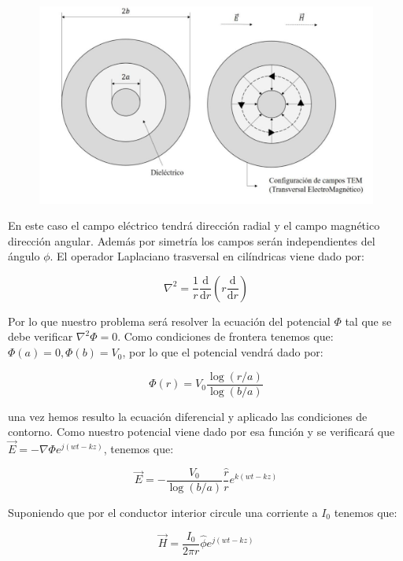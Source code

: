 \documentclass[12pt]{article}
\newcommand{\parentesis}[1]{\left( #1  \right)}
\newcommand{\D}{\mathrm{d}}
\begin{document}
\begin{figure}[h!] \centering
\includegraphics[scale=0.5]{lineatrasmision1.png}
\end{figure}


En este caso el campo eléctrico tendrá dirección radial y el campo magnético dirección angular. Además por simetría los campos serán independientes del ángulo $\phi$. El operador Laplaciano trasversal en cilíndricas viene dado por:

$$ \nabla^2 = \dfrac{1}{r} \dfrac{\D}{\D r} \parentesis{r \dfrac{\D }{\D r}} $$
 
Por lo que nuestro problema será resolver la ecuación del potencial $\Phi$ tal que se debe verificar $\nabla^2 \Phi = 0$. Como condiciones de frontera tenemos que: $\Phi (a) = 0, \Phi (b) = V_0$, por lo que el potencial vendrá dado por:

\begin{equation}
\Phi (r) = V_0 \dfrac{\log (r/a)}{\log (b/a)}
\end{equation} 

una vez hemos resulto la ecuación diferencial y aplicado las condiciones de contorno. Como nuestro potencial viene dado por esa función y se verificará que $\vec{E} = - \nabla \Phi e^{j(wt-kz)}$, tenemos que:

\begin{equation}
\vec{E} = - \dfrac{V_0}{\log(b/a)} \dfrac{\hat{r}}{r} e^{k(wt-kz)}
\end{equation}

Suponiendo que por el conductor interior circule una corriente a $I_0$ tenemos que:

\begin{equation}
\vec{H} = \dfrac{I_0}{2 \pi r} \hat{\phi}  e^{j(wt-kz)} 
\end{equation}
\end{document}
